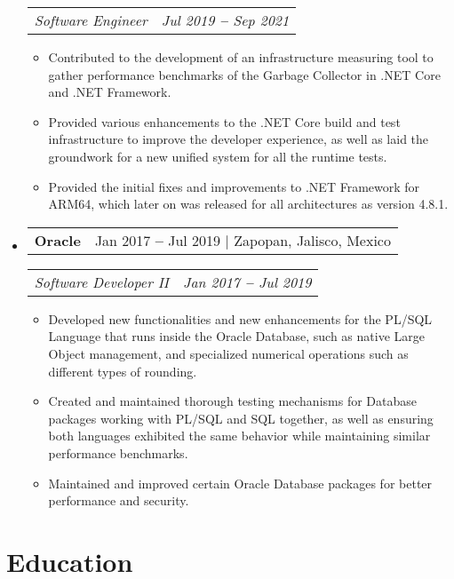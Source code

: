 \documentclass[letterpaper, 11pt]{article}
\makeatletter
\newcommand{\resumeCompanyHeading}[3]{
  \vspace{-2pt}\item
  \begin{tabular*}{0.97\textwidth}[t]{l@{\extracolsep{\fill}}r}
    \textbf{#1} & #2 $|$ #3
  \end{tabular*}
}
\newcommand{\resumePositionHeading}[2]{
  \vspace{-3pt}
  \begin{tabular*}{0.97\textwidth}[t]{l@{\extracolsep{\fill}}r}
    \textit{\small#1} & \textit{\small#2}
  \end{tabular*}\vspace{-7pt}
}
\newcommand{\resumeItem}[1]{
  \item\small{
    {#1 \vspace{-2pt}}
  }
}
\makeatother
\begin{document}
\begin{itemize}[leftmargin=0.15in, label={}]

    \resumePositionHeading
      {Software Engineer}{Jul 2019 \textbf{--} Sep 2021}

      \begin{itemize}
        \resumeItem{Contributed to the development of an infrastructure measuring tool to gather performance benchmarks of the Garbage Collector in .NET Core and .NET Framework.}
        \resumeItem{Provided various enhancements to the .NET Core build and test infrastructure to improve the developer experience, as well as laid the groundwork for a new unified system for all the runtime tests.}
        \resumeItem{Provided the initial fixes and improvements to .NET Framework for ARM64, which later on was released for all architectures as version 4.8.1.}
      \end{itemize}\vspace{-5pt}


  \resumeCompanyHeading
    {Oracle}{Jan 2017 \textbf{--} Jul 2019}{Zapopan, Jalisco, Mexico}


    \resumePositionHeading
      {Software Developer II}{Jan 2017 \textbf{--} Jul 2019}

      \begin{itemize}
        \resumeItem{Developed new functionalities and new enhancements for the PL/SQL Language that runs inside the Oracle Database, such as native Large Object management, and specialized numerical operations such as different types of rounding.}
        \resumeItem{Created and maintained thorough testing mechanisms for Database packages working with PL/SQL and SQL together, as well as ensuring both languages exhibited the same behavior while maintaining similar performance benchmarks.}
        \resumeItem{Maintained and improved certain Oracle Database packages for better performance and security.}
      \end{itemize}\vspace{-5pt}

\end{itemize}


\section{Education}
\vspace{1pt}
\end{document}
